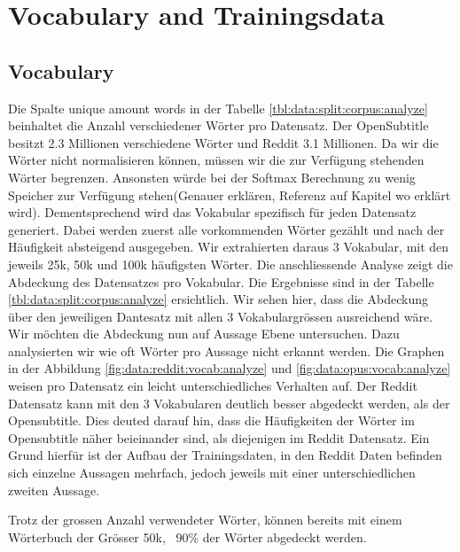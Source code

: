 \section{Vocabulary and Trainingsdata}
\subsection{Vocabulary}
Die Spalte unique amount words in der Tabelle \ref{tbl:data:split:corpus:analyze} beinhaltet die Anzahl verschiedener Wörter pro Datensatz. Der OpenSubtitle besitzt 2.3 Millionen verschiedene Wörter und Reddit 3.1 Millionen. Da wir die Wörter nicht normalisieren können, müssen wir die zur Verfügung stehenden Wörter begrenzen. Ansonsten würde bei der Softmax Berechnung zu wenig Speicher zur Verfügung stehen(Genauer erklären, Referenz auf Kapitel wo erklärt wird). Dementsprechend wird das Vokabular spezifisch für jeden Datensatz generiert.
Dabei werden zuerst alle vorkommenden Wörter gezählt und nach der Häufigkeit absteigend ausgegeben. Wir extrahierten daraus 3 Vokabular, mit den jeweils 25k, 50k und 100k häufigsten Wörter. Die anschliessende Analyse zeigt die Abdeckung des Datensatzes pro Vokabular. Die Ergebnisse sind in der Tabelle \ref{tbl:data:split:corpus:analyze} ersichtlich. Wir sehen hier, dass die Abdeckung über den jeweiligen Dantesatz  mit allen 3 Vokabulargrössen ausreichend wäre.
Wir möchten die Abdeckung nun auf Aussage Ebene untersuchen. Dazu analysierten wir wie oft Wörter pro Aussage nicht erkannt werden. Die Graphen in der Abbildung \ref{fig:data:reddit:vocab:analyze} und \ref{fig:data:opus:vocab:analyze} weisen pro Datensatz ein leicht unterschiedliches Verhalten auf. Der Reddit Datensatz kann mit den 3 Vokabularen deutlich besser abgedeckt werden, als der Opensubtitle. Dies deuted darauf hin, dass die Häufigkeiten der Wörter im Opensubtitle näher beieinander sind, als diejenigen im Reddit Datensatz. Ein Grund hierfür ist der Aufbau der Trainingsdaten, in den Reddit Daten befinden sich einzelne Aussagen mehrfach, jedoch jeweils mit einer unterschiedlichen zweiten Aussage.

Trotz der grossen Anzahl verwendeter Wörter, können bereits mit einem Wörterbuch der Grösser 50k, ~90\% der Wörter abgedeckt werden.

